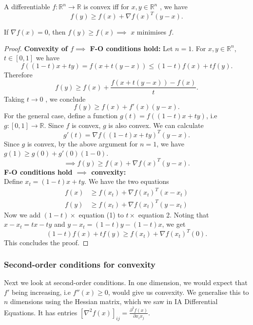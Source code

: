 \documentclass[egregdoesnotlikesansseriftitles,a4paper]{scrartcl}
\begin{document}
\begin{theorem}
	 A differentiable $f:\mathbb{R}^n\rightarrow \mathbb{R}$ is convex iff for $x,y \in \mathbb{R}^{n} $ , we have 
	 \[f(y) \geq f(x)+\nabla f(x)^T (y-x).\]  
\end{theorem}

\begin{remark}
	If $\nabla f(x)=0$, then $f(y)\geq f(x) \implies$ $x$ minimises $f$.
\end{remark}

\begin{proof}
	\textbf{Convexity of $f \implies$ F-O conditions hold:}\newline 
	 Let $n=1$. For $x,y\in \mathbb{R}^{n}$, $t \in [0,1]$ we have 
	 \[f((1-t)x+ty)=f(x+t(y-x))\leq (1-t)f(x)+tf(y).\]
	 Therefore 
	 \[f(y) \geq f(x)+\frac{f(x+t(y-x))-f(x)}{t}.\] 
	 Taking $t \rightarrow 0$ , we conclude 
	 \[f(y) \geq f(x)+f'(x)(y-x).\]
	 For the general case, define a function $g(t)=f((1-t)x+ty)$, i.e $g: [0,1] \rightarrow \mathbb{R}$. Since $f$ is convex, $g$ is also convex. We can calculate 
	 \[g'(t)=\nabla f((1-t)x+ty)^T(y-x).\] 
	 Since $g$ is convex, by the above argument for $n=1$, we have $g(1)\geq g(0)+g'(0)(1-0)$. 
	 \[\implies f(y) \geq f(x)+\nabla f(x)^T(y-x).\] 
	 \textbf{F-O conditions hold $\implies$ convexity:}\\
	 Define $x_t=(1-t)x+ty$. We have the two equations
	 \begin{align}
		 f(x) &\geq f(x_t)+\nabla f(x_t)^T (x-x_t)\\
		 f(y) &\geq f(x_t)+\nabla f(x_t)^T (y-x_t)
	 \end{align}
	 Now we add $(1-t)\times$ equation (1) to $t \times$ equation 2. Noting that $x-x_t=tx-ty$ and $y-x_t=(1-t)y-(1-t)x$, we get 
	 \[(1-t)f(x)+tf(y)\geq f(x_t)+\nabla f(x_t)^T (0).\] 
	 This concludes the proof.
\end{proof}

\subsubsection{Second-order conditions for convexity}

Next we look at second-order conditions. In one dimension, we would expect that $f'$ being increasing, i.e $f''(x) \geq 0$, would give us convexity. We generalise this to $n$ dimensions using the Hessian matrix, which we saw in IA Differential Equations. It has entries $[\nabla^2f(x)]_{ij}=\frac{\partial^2 f(x)}{\partial x_i x_j} $.
\end{document}
